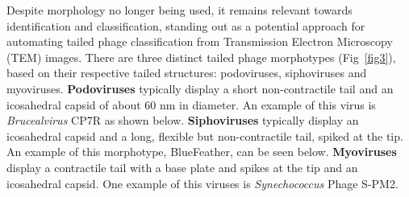 \documentclass[runningheads]{llncs}
\begin{document}
%
%
Despite morphology no longer being used, it remains relevant towards identification and classification, standing out as a potential approach for automating tailed phage classification from Transmission Electron Microscopy (TEM) images. There are three distinct tailed phage morphotypes (Fig~\ref{fig3}), based on their respective tailed structures: podoviruses, siphoviruses and myoviruses. \cite{maffei2021} \textbf{Podoviruses} typically display a short non-contractile tail and an icosahedral capsid of about 60 nm in diameter. An example of this virus is \textit{Brucealvirus} CP7R as shown below. \cite{volozhantsev2012} \textbf{Siphoviruses} typically display an icosahedral capsid and a long, flexible but non-contractile tail, spiked at the tip. An example of this morphotype, BlueFeather, can be seen below. \cite{demo2021} \textbf{Myoviruses} display a contractile tail with a base plate and spikes at the tip and an icosahedral capsid. One example of this viruses is \textit{Synechococcus} Phage S-PM2. \cite{mann2005}
\end{document}
